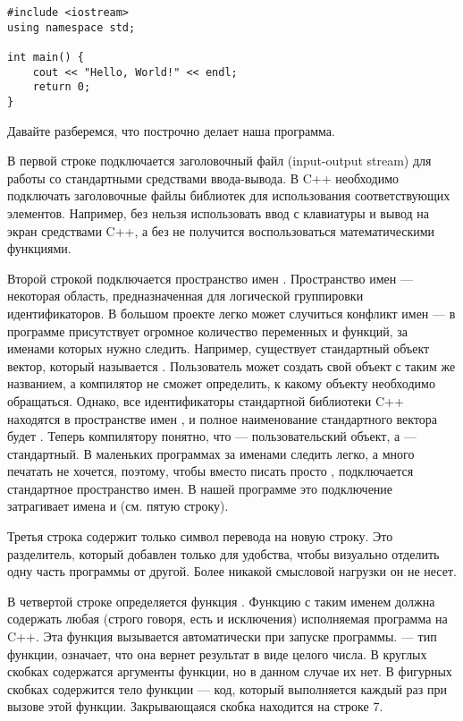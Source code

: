 \documentclass{article}
\begin{document}
\begin{lstlisting}[caption={Наша первая программа <<Hello, world!>>}, captionpos=b, style=cpp]
#include <iostream>
using namespace std;

int main() {
	cout << "Hello, World!" << endl;
	return 0;
}
\end{lstlisting}

Давайте разберемся, что построчно делает наша программа.

В первой строке подключается заголовочный файл  (input-output stream) для работы со стандартными средствами ввода-вывода. В C++ необходимо подключать заголовочные файлы библиотек для использования соответствующих элементов. Например, без  нельзя использовать ввод с клавиатуры и вывод на экран средствами C++, а без  не получится воспользоваться математическими функциями.

Второй строкой подключается пространство имен . Пространство имен --- некоторая область, предназначенная для логической группировки идентификаторов. В большом проекте легко может случиться конфликт имен --- в программе присутствует огромное количество переменных и функций, за именами которых нужно следить. Например, существует стандартный объект вектор, который называется . Пользователь может создать свой объект с таким же названием, а компилятор не сможет определить, к какому объекту необходимо обращаться. Однако, все идентификаторы стандартной библиотеки C++ находятся в пространстве имен , и полное наименование стандартного вектора будет . Теперь компилятору понятно, что  --- пользовательский объект, а  --- стандартный. В маленьких программах за именами следить легко, а много печатать не хочется, поэтому, чтобы вместо  писать просто , подключается стандартное пространство имен. В нашей программе это подключение затрагивает имена  и  (см. пятую строку).

Третья строка содержит только символ перевода на новую строку. Это разделитель, который добавлен только для удобства, чтобы визуально отделить одну часть программы от другой. Более никакой смысловой нагрузки он не несет.

В четвертой строке определяется функция . Функцию с таким именем должна содержать любая (строго говоря, есть и исключения) исполняемая программа на C++. Эта функция вызывается автоматически при запуске программы.  --- тип функции, означает, что она вернет результат в виде целого числа. В круглых скобках содержатся аргументы функции, но в данном случае их нет. В фигурных скобках содержится тело функции --- код, который выполняется каждый раз при вызове этой функции. Закрывающаяся скобка находится на строке 7.
\end{document}
